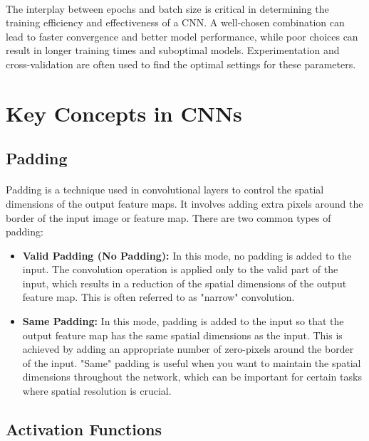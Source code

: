 \paragraph{}
The interplay between epochs and batch size is critical in determining the training efficiency and effectiveness of a CNN. A well-chosen combination can lead to faster convergence and better model performance, while poor choices can result in longer training times and suboptimal models. Experimentation and cross-validation are often used to find the optimal settings for these parameters.

\section{Key Concepts in CNNs}
\label{sec:key-concepts}

\subsection{Padding}
\paragraph{}
Padding is a technique used in convolutional layers to control the spatial dimensions of the output feature maps. It involves adding extra pixels around the border of the input image or feature map. There are two common types of padding:

\begin{itemize}
    \item \textbf{Valid Padding (No Padding):} In this mode, no padding is added to the input. The convolution operation is applied only to the valid part of the input, which results in a reduction of the spatial dimensions of the output feature map. This is often referred to as "narrow" convolution.
    
    \item \textbf{Same Padding:} In this mode, padding is added to the input so that the output feature map has the same spatial dimensions as the input. This is achieved by adding an appropriate number of zero-pixels around the border of the input. "Same" padding is useful when you want to maintain the spatial dimensions throughout the network, which can be important for certain tasks where spatial resolution is crucial.
\end{itemize}

\subsection{Activation Functions}
